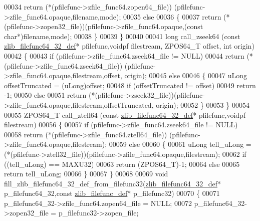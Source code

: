 \begin{DoxyCode}
00034         \textcolor{keywordflow}{return} (*(pfilefunc->zfile\_func64.zopen64\_file)) (pfilefunc->zfile\_func64.opaque,filename,mode);
00035     \textcolor{keywordflow}{else}
00036     \{
00037         \textcolor{keywordflow}{return} (*(pfilefunc->zopen32\_file))(pfilefunc->zfile\_func64.opaque,(\textcolor{keyword}{const} \textcolor{keywordtype}{char}*)filename,mode);
00038     \}
00039 \}
00040 
00041 \textcolor{keywordtype}{long} call\_zseek64 (\textcolor{keyword}{const} \hyperlink{structzlib__filefunc64__32__def__s}{zlib\_filefunc64\_32\_def}* pfilefunc,voidpf filestream, 
      ZPOS64\_T offset, \textcolor{keywordtype}{int} origin)
00042 \{
00043     \textcolor{keywordflow}{if} (pfilefunc->zfile\_func64.zseek64\_file != NULL)
00044         \textcolor{keywordflow}{return} (*(pfilefunc->zfile\_func64.zseek64\_file)) (pfilefunc->zfile\_func64.opaque,filestream,offset,
      origin);
00045     \textcolor{keywordflow}{else}
00046     \{
00047         uLong offsetTruncated = (uLong)offset;
00048         \textcolor{keywordflow}{if} (offsetTruncated != offset)
00049             \textcolor{keywordflow}{return} -1;
00050         \textcolor{keywordflow}{else}
00051             \textcolor{keywordflow}{return} (*(pfilefunc->zseek32\_file))(pfilefunc->zfile\_func64.opaque,filestream,offsetTruncated,
      origin);
00052     \}
00053 \}
00054 
00055 ZPOS64\_T call\_ztell64 (\textcolor{keyword}{const} \hyperlink{structzlib__filefunc64__32__def__s}{zlib\_filefunc64\_32\_def}* pfilefunc,voidpf filestream)
00056 \{
00057     \textcolor{keywordflow}{if} (pfilefunc->zfile\_func64.zseek64\_file != NULL)
00058         \textcolor{keywordflow}{return} (*(pfilefunc->zfile\_func64.ztell64\_file)) (pfilefunc->zfile\_func64.opaque,filestream);
00059     \textcolor{keywordflow}{else}
00060     \{
00061         uLong tell\_uLong = (*(pfilefunc->ztell32\_file))(pfilefunc->zfile\_func64.opaque,filestream);
00062         \textcolor{keywordflow}{if} ((tell\_uLong) == MAXU32)
00063             \textcolor{keywordflow}{return} (ZPOS64\_T)-1;
00064         \textcolor{keywordflow}{else}
00065             \textcolor{keywordflow}{return} tell\_uLong;
00066     \}
00067 \}
00068 
00069 \textcolor{keywordtype}{void} fill\_zlib\_filefunc64\_32\_def\_from\_filefunc32(\hyperlink{structzlib__filefunc64__32__def__s}{zlib\_filefunc64\_32\_def}* 
      p\_filefunc64\_32,\textcolor{keyword}{const} \hyperlink{structzlib__filefunc__def__s}{zlib\_filefunc\_def}* p\_filefunc32)
00070 \{
00071     p\_filefunc64\_32->zfile\_func64.zopen64\_file = NULL;
00072     p\_filefunc64\_32->zopen32\_file = p\_filefunc32->zopen\_file;

\end{DoxyCode}
